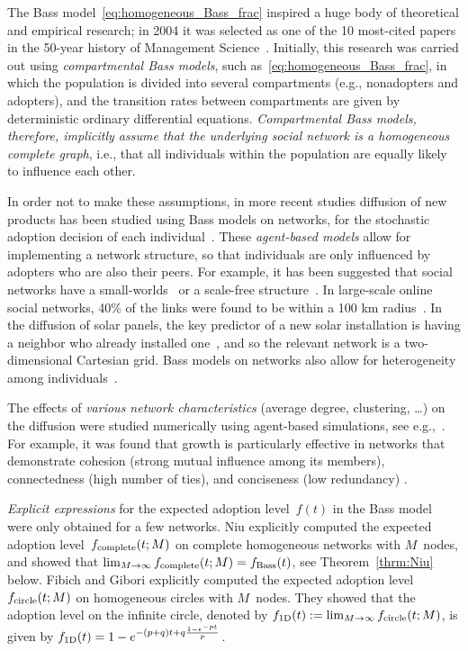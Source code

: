 \documentclass[review]{elsarticle}
\begin{document}
The Bass model~\eqref{eq:homogeneous_Bass_frac} inspired a
huge body of theoretical and empirical research; in 2004 it  
was selected as one of the 10 most-cited papers in the 50-year
history of Management Science~\citep{Hopp-04}. Initially, this research was carried out using {\em compartmental Bass models}, such as~\eqref{eq:homogeneous_Bass_frac}, in which the population is divided into several  compartments (e.g., nonadopters and adopters), and the transition
rates between compartments are given by deterministic ordinary differential equations.  {\it Compartmental Bass models, therefore, 
	implicitly assume  that the underlying social network is a homogeneous complete graph}, i.e., that
all individuals within the population are equally likely to influence each other.

In order not to make these assumptions, in more recent studies
diffusion of new products has been studied 
using  Bass models on networks, for the stochastic adoption decision of each individual~\citep{Delre-07, OR-10, Garber-04, Garcia-05, Muller-Peres-19, Rand-11}. 
These {\em agent-based models} allow for implementing a network structure, so that individuals are only influenced by adopters who are also their peers. For example, it has been suggested that social networks have a small-worlds~\citep{watts1998collective} or a scale-free structure~\citep{barabasi1999emergence}. 
In large-scale online social networks,   40\% of the links
were found to be within a 100 km radius~\citep{scellato2011socio}.
In the diffusion of solar panels, the key predictor of a new solar installation is having a neighbor who already installed one~\citep{Bollinger-12,Graziano-15}, and so  the relevant network is a two-dimensional Cartesian grid.  Bass models on networks also allow for heterogeneity among individuals~\cite{PNAS-12,fibich2022diffusion, GLM-01}.


   The  effects of 
	{\em various network  characteristics}  (average degree, clustering, \dots)  
on the diffusion were studied numerically using agent-based simulations, see e.g.,~\cite{Goldenberg-10,Goldenberg-08,Peres-14}. For example, it was found that growth is particularly effective in networks that demonstrate cohesion (strong mutual influence among its members), connectedness (high number of ties),
and conciseness (low redundancy) \cite{Muller-Peres-19}.

{\it Explicit expressions} for the expected adoption level~$f(t)$ in the  Bass model were only obtained for a few networks.
Niu \cite{Niu-02} explicitly computed the expected adoption level~$f_{\rm complete}(t;M)$ on complete homogeneous networks with $M$~nodes, and showed that
$\lim_{M \to \infty} f_{\rm complete}(t;M) = f_{\rm Bass}(t)$, see  Theorem~\ref{thrm:Niu} below. 
Fibich and Gibori \cite{OR-10} explicitly computed the expected adoption level~$f_{\rm circle}(t;M)$ on  homogeneous circles with $M$~nodes. They showed that the adoption level on the infinite circle,
 denoted by $f_{\rm 1D}(t):=\lim_{M \to \infty} f_{\rm circle}(t;M)$,
  is given by $f_{\rm 1D}(t)=1-e^{-(p+q)t+q\frac{1-e^{-pt}}{p}}$.
\end{document}
